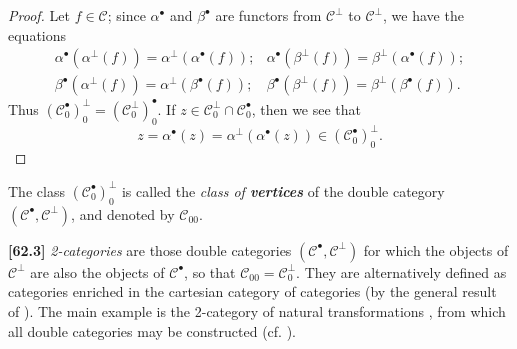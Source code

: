 \documentclass[a4paper,fleqn]{article}
\theoremstyle{plain}
\theoremstyle{definition}
\newenvironment{definition}[1]
  {\renewcommand\theinnerdefinition{#1}\innerdefinition}
  {\endinnerdefinition}
\newenvironment{longcomm}[1]
  {\noindent\textbf{[#1]}\rmfamily}
  {}
\newcommand{\oldpage}[1]{{\marginpar{\footnotesize$\bigg\vert$\,\,\,\,\textit{p.~#1}}}}
\newcommand{\unsure}[1]{{\color{purple}\textbf{#1}}}
\newcommand{\CC}{\mathcal{C}}
\begin{document}
\begin{proof}
  Let $f\in\CC$;
  since $\alpha^\bullet$ and $\beta^\bullet$ are functors from $\CC^\perp$ to $\CC^\perp$, we have the equations
  \[
    \begin{array}{cc}
      \alpha^\bullet(\alpha^\perp(f))
      = \alpha^\perp(\alpha^\bullet(f));
      & \alpha^\bullet(\beta^\perp(f))
      = \beta^\perp(\alpha^\bullet(f));
    \\\beta^\bullet(\alpha^\perp(f))
      = \alpha^\perp(\beta^\bullet(f));
      & \beta^\bullet(\beta^\perp(f))
      = \beta^\perp(\beta^\bullet(f)).
    \end{array}
  \]
  Thus $(\CC_0^\bullet)_0^\perp=(\CC_0^\perp)_0^\bullet$.
  If $z\in\CC_0^\perp\cap\CC_0^\bullet$, then we see that
  \[
    z
    = \alpha^\bullet(z)
    = \alpha^\perp(\alpha^\bullet(z))
    \in (\CC_0^\bullet)_0^\perp.
  \]
\end{proof}

\begin{definition}{11}
\label{definition:ii-11}
  The class $(\CC_0^\bullet)_0^\perp$ is called the \emph{class of \unsure{vertices}} of the double category $(\CC^\bullet,\CC^\perp)$, and denoted by $\CC_{00}$.
\end{definition}

\begin{longcomm}{62.3}
  \emph{2-categories} are those double categories $(\CC^\bullet,\CC^\perp)$ for which the objects of $\CC^\perp$ are also the objects of $\CC^\bullet$, so that $\CC_{00}=\CC_0^\perp$.
  They are alternatively defined as categories enriched in the cartesian category of categories (by the general result of \cite[Appendix]{coll120}).
  The main example is the 2-category of natural transformations \cite{coll52}, from which all double categories may be constructed (cf. \cite[Comment~105.1]{coll64}).
\end{longcomm}

\oldpage{391}
\end{document}
